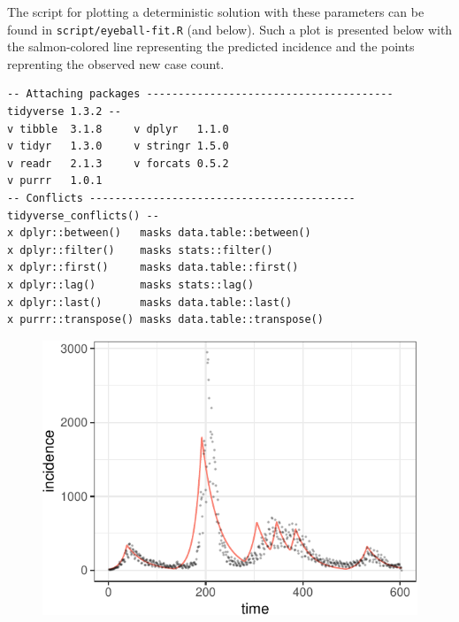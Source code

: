 \documentclass[
  11pt,
  letterpaper,
  DIV=11,
  numbers=noendperiod]{scrartcl}
\begin{document}
The script for plotting a deterministic solution with these parameters
can be found in \texttt{script/eyeball-fit.R} (and below). Such a plot
is presented below with the salmon-colored line representing the
predicted incidence and the points reprenting the observed new case
count.

\begin{verbatim}
-- Attaching packages --------------------------------------- tidyverse 1.3.2 --
v tibble  3.1.8     v dplyr   1.1.0
v tidyr   1.3.0     v stringr 1.5.0
v readr   2.1.3     v forcats 0.5.2
v purrr   1.0.1     
-- Conflicts ------------------------------------------ tidyverse_conflicts() --
x dplyr::between()   masks data.table::between()
x dplyr::filter()    masks stats::filter()
x dplyr::first()     masks data.table::first()
x dplyr::lag()       masks stats::lag()
x dplyr::last()      masks data.table::last()
x purrr::transpose() masks data.table::transpose()
\end{verbatim}

\begin{figure}

{\centering \includegraphics{progress_files/figure-pdf/unnamed-chunk-4-1.pdf}

}

\end{figure}
\end{document}
